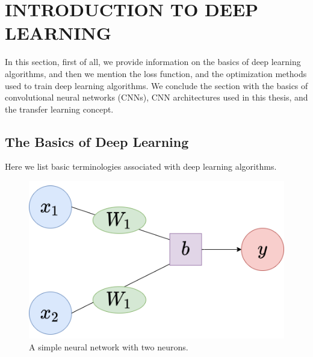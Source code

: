 \chapter{INTRODUCTION TO DEEP LEARNING}
\label{ch:CH3}

In this section, first of all, we provide information on the basics of deep learning algorithms, and then we mention the loss function, and the optimization methods used to train deep learning algorithms. We conclude the section with the basics of convolutional neural networks (CNNs), CNN architectures used in this thesis, and the transfer learning concept.

\section{The Basics of Deep Learning}

Here we list basic terminologies associated with deep learning algorithms.

\begin{figure}[h]
	\centering
	
	\includegraphics[width=.8\linewidth]{fig/simpleNN_2Neurons.png}
	\caption{A simple neural network with two neurons.}
	
	\label{fig:basic_neuron}
\end{figure}


